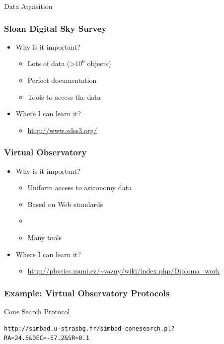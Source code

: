 \documentclass[fleqn]{beamer}
\begin{document}
\begin{section}{Data Aquisition}
  \begin{frame}\frametitle{Sloan Digital Sky Survey}
  \begin{itemize}
    \item{Why is it important?}
      \begin{itemize}
        \item Lots of data (>$10^6$ objects)
        \item Perfect documentation
        \item Tools to access the data
      \end{itemize}
    \item{Where I can learn it?}
      \begin{itemize}
       \item \url{http://www.sdss3.org/}
      \end{itemize}
  \end{itemize}
  \end{frame}

  \begin{frame}\frametitle{Virtual Observatory}
  \begin{itemize}
    \item{Why is it important?}
      \begin{itemize}
        \item Uniform access to astronomy data
        \item Based on Web standards
        \item 
        \item Many tools
      \end{itemize}
    \item{Where I can learn it?}
      \begin{itemize}
       \item \url{http://physics.muni.cz/~vazny/wiki/index.php/Diploma_work}
      \end{itemize}
  \end{itemize}
  \end{frame}


\begin{frame}[containsverbatim]\frametitle{Example: Virtual
    Observatory Protocols}

Cone Search Protocol

\begin{lstlisting}
http://simbad.u-strasbg.fr/simbad-conesearch.pl?RA=24.5&DEC=-57.2&SR=0.1
\end{lstlisting}



\end{frame}
\end{section}
\end{document}
